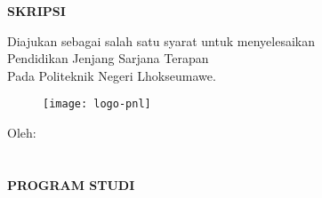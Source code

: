 \begin{center}
    \thispagestyle{empty}
\large
\MakeUppercase{\textbf{skripsi}}

\vfill
\normalsize
Diajukan sebagai salah satu syarat untuk menyelesaikan \\
Pendidikan Jenjang Sarjana Terapan\\
Pada Politeknik Negeri Lhokseumawe.

\vfill
\begin{figure}[h]
\centering
\texttt{[image: logo-pnl]}
\end{figure}

\vfill
\normalsize
\MakeUppercase{\textbf{\judulId}}

\vfill
Oleh: \\
\MakeUppercase{\mahasiswa} \\
\nim \\

\vfill
\MakeUppercase{
\textbf{
program studi \prodi \\
\jurusan \\
\institusi \\
\the\year{}
}}

\end{center}